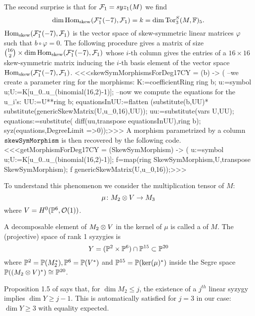 \medskip
The second surprise is that for ${\mathcal F}_1 = syz_1(M)$ we find
$$\dim \operatorname{Hom}_{\rm skew}({\mathcal F}_1^*(-7),{\mathcal F}_1) =k= \dim {\rm{Tor}}_3^S(M,{\mathbb F})_5.$$
$\operatorname{Hom}_{\rm skew}({\mathcal F}_1^*(-7),{\mathcal F}_1)$ is the vector space of skew-symmetric
linear matrices $\varphi$ such that $b \circ \varphi = 0$.
The following procedure gives a matrix of size
$\binom{16}2\times\dim \operatorname{Hom}_{\rm skew}({\mathcal F}_1^*(-7),{\mathcal F}_1)$
whose $i$-th column gives the entries of a $16\times16$ skew-symmetric matrix 
inducing the $i$-th basis element of the vector space $\operatorname{Hom}_{\rm skew}({\mathcal F}_1^*(-7),{\mathcal F}_1)$.
<<<skewSymMorphismsForDeg17CY = (b) -> (
     --we create a parameter ring for the morphisms: 
     K:=coefficientRing ring b;
     u:=symbol u;U:=K[u_0..u_(binomial(16,2)-1)];
     --now we compute the equations for the u_i's:
     UU:=U**ring b;
     equationsInUU:=flatten (substitute(b,UU)*
          substitute(genericSkewMatrix(U,u_0,16),UU));
     uu:=substitute(vars U,UU);
     equations:=substitute(
          diff(uu,transpose equationsInUU),ring b);
     syz(equations,DegreeLimit =>0));>>>
A morphism parametrized by a column $\tt skewSymMorphism$ is then recovered
by the following code.
<<<getMorphismForDeg17CY = (SkewSymMorphism) -> (
     u:=symbol u;U:=K[u_0..u_(binomial(16,2)-1)];
     f=map(ring SkewSymMorphism,U,transpose SkewSymMorphism);
     f genericSkewMatrix(U,u_0,16));>>>


To understand this phenomenon we consider the multiplication tensor of $M$:
$$\mu \colon M_2 \otimes V \to M_3$$
where $V=H^0({\mathbb P}^6,{\mathcal O}(1))$. 

\begin{definition} A decomposable element of $M_2 \otimes V$ in the kernel of 
$\mu$ is called a  of $M$.
The (projective) space of rank 1 syzygies is
$$Y=({\mathbb P}^2 \times {\mathbb P}^6) \cap {\mathbb P}^{15} \subset {\mathbb P}^{20}$$
where ${\mathbb P}^2={\mathbb P}(M_2^*),{\mathbb P}^6={\mathbb P}(V^*)$ and ${\mathbb P}^{15}={\mathbb P}(\ker(\mu)^*)$
inside the Segre space ${\mathbb P}((M_2 \otimes V)^*)\cong {\mathbb P}^{20}$. 
\end{definition}

Proposition 1.5 of \cite{CO:Gr1} says that, for $\dim M_2 \le j$,
the existence of a $j^{th}$ linear syzygy implies $\dim Y \ge j-1$. 
This is automatically satisfied for $j=3$
in our case: $\dim Y \ge 3$ with equality expected. 

